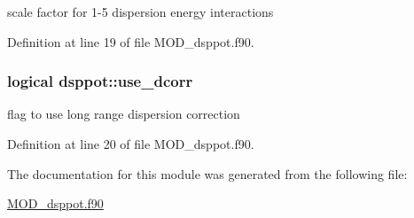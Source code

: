 scale factor for 1-\/5 dispersion energy interactions 



Definition at line 19 of file M\-O\-D\-\_\-dsppot.\-f90.

\hypertarget{classdsppot_a6d08119e9c2cbd027dc0256f83f12e97}{
\subsubsection[{use\-\_\-dcorr}]{\setlength{\rightskip}{0pt plus 5cm}logical dsppot\-::use\-\_\-dcorr}}\label{classdsppot_a6d08119e9c2cbd027dc0256f83f12e97}


flag to use long range dispersion correction 



Definition at line 20 of file M\-O\-D\-\_\-dsppot.\-f90.



The documentation for this module was generated from the following file\-:\begin{DoxyCompactItemize}
\item 
\hyperlink{MOD__dsppot_8f90}{M\-O\-D\-\_\-dsppot.\-f90}\end{DoxyCompactItemize}
